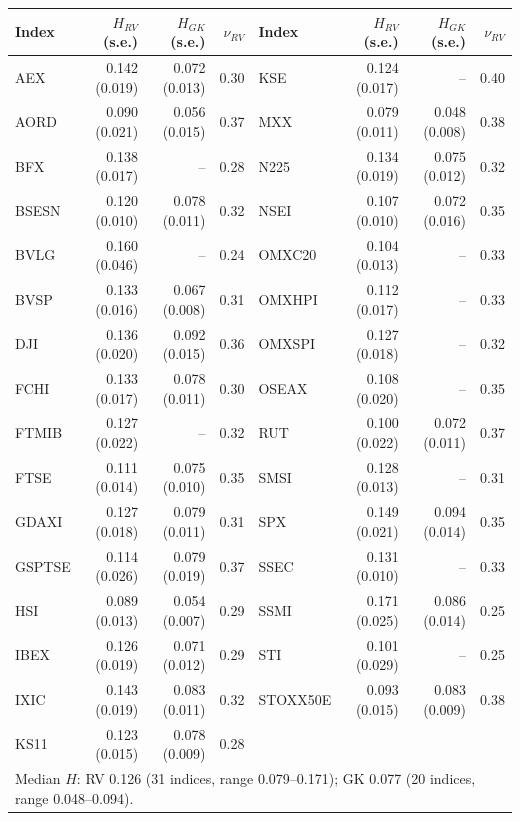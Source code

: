 \begin{tabular}{lrrr@{\hskip 18pt}lrrr}
\toprule
Index & $H_{RV}$ (s.e.) & $H_{GK}$ (s.e.) & $\nu_{RV}$ & Index & $H_{RV}$ (s.e.) & $H_{GK}$ (s.e.) & $\nu_{RV}$\\
\midrule
AEX & 0.142 (0.019) & 0.072 (0.013) & 0.30 & KSE & 0.124 (0.017) & -- & 0.40\\
AORD & 0.090 (0.021) & 0.056 (0.015) & 0.37 & MXX & 0.079 (0.011) & 0.048 (0.008) & 0.38\\
BFX & 0.138 (0.017) & -- & 0.28 & N225 & 0.134 (0.019) & 0.075 (0.012) & 0.32\\
BSESN & 0.120 (0.010) & 0.078 (0.011) & 0.32 & NSEI & 0.107 (0.010) & 0.072 (0.016) & 0.35\\
BVLG & 0.160 (0.046) & -- & 0.24 & OMXC20 & 0.104 (0.013) & -- & 0.33\\
BVSP & 0.133 (0.016) & 0.067 (0.008) & 0.31 & OMXHPI & 0.112 (0.017) & -- & 0.33\\
DJI & 0.136 (0.020) & 0.092 (0.015) & 0.36 & OMXSPI & 0.127 (0.018) & -- & 0.32\\
FCHI & 0.133 (0.017) & 0.078 (0.011) & 0.30 & OSEAX & 0.108 (0.020) & -- & 0.35\\
FTMIB & 0.127 (0.022) & -- & 0.32 & RUT & 0.100 (0.022) & 0.072 (0.011) & 0.37\\
FTSE & 0.111 (0.014) & 0.075 (0.010) & 0.35 & SMSI & 0.128 (0.013) & -- & 0.31\\
GDAXI & 0.127 (0.018) & 0.079 (0.011) & 0.31 & SPX & 0.149 (0.021) & 0.094 (0.014) & 0.35\\
GSPTSE & 0.114 (0.026) & 0.079 (0.019) & 0.37 & SSEC & 0.131 (0.010) & -- & 0.33\\
HSI & 0.089 (0.013) & 0.054 (0.007) & 0.29 & SSMI & 0.171 (0.025) & 0.086 (0.014) & 0.25\\
IBEX & 0.126 (0.019) & 0.071 (0.012) & 0.29 & STI & 0.101 (0.029) & -- & 0.25\\
IXIC & 0.143 (0.019) & 0.083 (0.011) & 0.32 & STOXX50E & 0.093 (0.015) & 0.083 (0.009) & 0.38\\
KS11 & 0.123 (0.015) & 0.078 (0.009) & 0.28 & & & &\\
\midrule
\multicolumn{8}{l}{Median $H$: RV 0.126 (31 indices, range 0.079--0.171); GK 0.077 (20 indices, range 0.048--0.094).}\\
\bottomrule
\end{tabular}